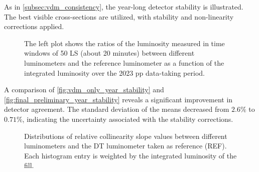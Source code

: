 As in \autoref{subsec:vdm_consistency}, the year-long detector stability is illustrated. The best visible cross-sections are utilized, with stability and non-linearity corrections applied.

\begin{figure}[!htb]
    \centering
    \caption[Final full year stability]{The left plot shows the ratios of the luminosity measured in time windows of 50 LS (about 20 minutes) between different luminometers and the reference luminometer as a function of the integrated luminosity over the 2023 pp data-taking period.}
    \label{fig:final_preliminary_year_stability}
\end{figure}

A comparison of \autoref{fig:vdm_only_year_stability} and \autoref{fig:final_preliminary_year_stability} reveals a significant improvement in detector agreement. The standard deviation of the means decreased from $2.6\%$ to $0.71\%$, indicating the uncertainty associated with the stability corrections.

\begin{figure}[!htb]
    \centering
    \caption[Residual relative non-linearity distributions]{Distributions of relative collinearity slope values between different luminometers and the DT luminometer taken as reference (REF). Each histogram entry is weighted by the integrated luminosity of the fill.}
    \label{fig:year_slopes_final}
\end{figure}

